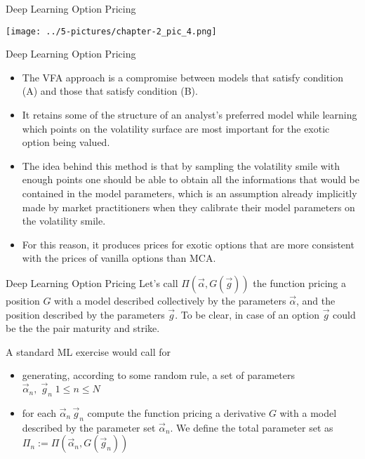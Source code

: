 \documentclass[11pt]{beamer}
\begin{document}
\begin{frame}{Deep Learning Option Pricing}
\begin{center}
\texttt{[image: ../5-pictures/chapter-2\_pic\_4.png]} 
\end{center}
\end{frame}
\begin{frame}{Deep Learning Option Pricing}
	\begin{itemize}
		\item The VFA approach is a compromise between models that satisfy condition (A) and those that
satisfy condition (B). 
\item It retains some of the structure of an analyst’s preferred model while learning
which points on the volatility surface are most important for the exotic option being valued. 
\item The idea behind
this method is that by sampling the volatility smile with enough points one
should be able to obtain all the informations that would be contained in the
model parameters, which is an assumption already implicitly made by market
practitioners when they calibrate their model parameters on the volatility
smile.
\item For this reason, it produces prices for exotic options that are more consistent with the prices of vanilla options than MCA.
	\end{itemize}
\end{frame}
\begin{frame}{Deep Learning Option Pricing}
Let's call $\Pi( \vec{\alpha}, G(\vec{g}) )$ the function pricing a position $G$ with a model described
collectively by the parameters $\vec{\alpha}$, and the position described by the parameters $\vec{g}$. To be clear, in case of an option $\vec{g}$ could be the the pair maturity and strike. 

A standard ML exercise would call for 
	\begin{itemize}
		\item generating, according to some random rule, a set of parameters $\vec{\alpha}_n,\; \vec{g}_n\; 1 \le n \le N$
\item for each $\vec{\alpha}_n\, \vec{g}_n$ compute the function pricing a derivative $G$ with a model described by the parameter set $\vec{\alpha}_n$. We define the total parameter set as  $\Pi_n := \Pi( \vec{\alpha}_n, G(\vec{g}_n))$
 
	\end{itemize}
\end{frame}
\end{document}
